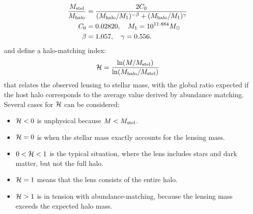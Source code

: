 \begin{equation}
\begin{aligned}
\frac{M_\text{stel}}{M_\text{halo}} &= \frac{2C_0}{(M_\text{halo}/M_1)^{-\beta} +
                                     (M_\text{halo}/M_1)^\gamma} \\
C_0 &= 0.02820, \quad M_1 = 10^{11.884} M_\odot \\
\beta &= 1.057, \quad \gamma = 0.556.
\end{aligned}
\end{equation}
and define a halo-matching index:
\begin{equation}
\mathcal{H} = \frac{\ln(M/M_\text{stel})}{\ln(M_\text{halo}/M_\text{stel})}
\end{equation}
that relates the observed lensing to stellar mass, with the
global ratio expected if the host halo corresponds to the
average value derived by abundance matching. Several cases
for $\mathcal{H}$ can be considered:
\begin{itemize}
\item $\mathcal{H} < 0$ is unphysical because $M<M_\text{stel}$.
\item $\mathcal{H} = 0$ is when the stellar mass exactly accounts for the
  lensing mass.
\item $0 < \mathcal{H} < 1$ is the typical situation, where the lens
  includes stars and dark matter, but not the full halo.
\item $\mathcal{H} = 1$ means that the lens consists of the entire halo.
\item $\mathcal{H} > 1$ is in tension with abundance-matching, because the
  lensing mass exceeds the expected halo mass.
\end{itemize}

